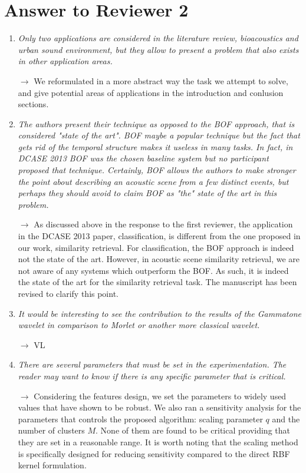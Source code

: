 \documentclass[10pt]{article}
\begin{document}
\section{Answer to Reviewer 2}

\begin{enumerate}

\item \emph{Only two applications are considered in the literature review, bioacoustics and urban sound environment, but they allow to present a problem that also exists in other application areas.}

$\rightarrow$ We reformulated in a more abstract way the task we attempt to solve, and give potential areas of applications in the introduction and conlusion sections.

\item \emph{The authors present their technique as opposed to the BOF approach, that is considered "state of the art". BOF maybe a popular technique but the fact that gets rid of the temporal structure makes it useless in many tasks. In fact, in DCASE 2013 BOF was the chosen baseline system but no participant proposed that technique. Certainly, BOF allows the authors to make stronger the point about describing an acoustic scene from a few distinct events, but perhaps they should avoid to claim BOF as "the" state of the art in this problem.}

$\rightarrow$
As discussed above in the response to the first reviewer, the application in the DCASE 2013 paper, classification, is different from the one proposed in our work, similarity retrieval. For classification, the BOF approach is indeed not the state of the art. However, in acoustic scene similarity retrieval, we are not aware of any systems which outperform the BOF. As such, it is indeed the state of the art for the similarity retrieval task. The manuscript has been revised to clarify this point.

\item \emph{It would be interesting to see the contribution to the results of the Gammatone wavelet in comparison to Morlet or another more classical wavelet.}

$\rightarrow$ VL

\item \emph{There are several parameters that must be set in the experimentation. The reader may want to know if there is any specific parameter that is critical.}

$\rightarrow$ Considering the features design, we set the parameters to widely used values that have shown to be robust. We also ran a sensitivity analysis for the parameters that controls the proposed algorithm: scaling parameter $q$ and the number of clusters $M$. None of them are found to be critical providing that they are set in a reasonable range. It is worth noting that the scaling method is specifically designed for reducing sensitivity compared to the direct RBF kernel formulation.


\end{enumerate}
\end{document}

